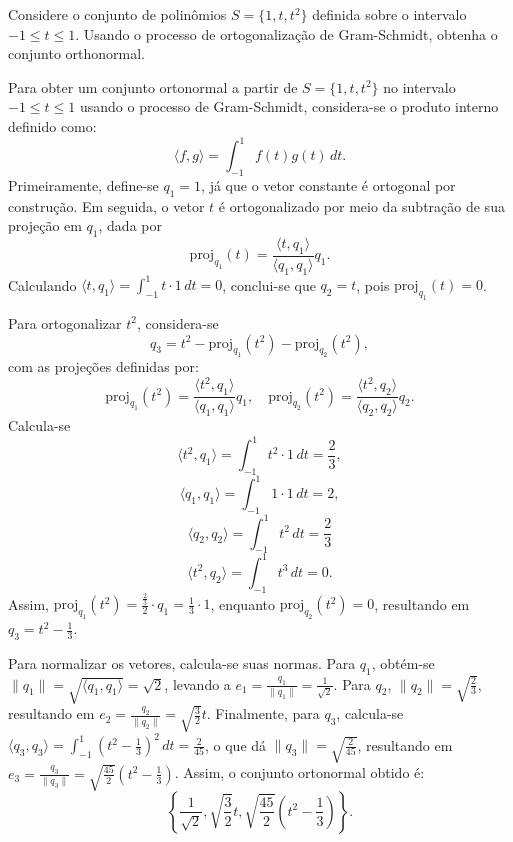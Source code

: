 \begin{question}
  Considere o conjunto de polinômios $S = \{1, t, t^2\}$ definida sobre o intervalo $-1 \leq t \leq 1$. Usando o processo de ortogonalização de Gram-Schmidt, obtenha o conjunto orthonormal.
\end{question}

\begin{resolution}
  Para obter um conjunto ortonormal a partir de \( S = \{1, t, t^2\} \) no intervalo \( -1 \leq t \leq 1 \) usando o processo de Gram-Schmidt, considera-se o produto interno definido como:
  $$ \langle f, g \rangle = \int_{-1}^1 f(t) g(t) \, dt.$$
  Primeiramente, define-se \( q_1 = 1 \), já que o vetor constante é ortogonal por construção. Em seguida, o vetor \( t \) é ortogonalizado por meio da subtração de sua projeção em \( q_1 \), dada por
  $$ \text{proj}_{q_1}(t) = \frac{\langle t, q_1 \rangle}{\langle q_1, q_1 \rangle} q_1.$$
  Calculando \( \langle t, q_1 \rangle = \int_{-1}^1 t \cdot 1 \, dt = 0 \), conclui-se que \( q_2 = t \), pois \( \text{proj}_{q_1}(t) = 0 \).

  Para ortogonalizar \( t^2 \), considera-se
  $$ q_3 = t^2 - \text{proj}_{q_1}(t^2) - \text{proj}_{q_2}(t^2),$$
  com as projeções definidas por:
  $$ \text{proj}_{q_1}(t^2) = \frac{\langle t^2, q_1 \rangle}{\langle q_1, q_1 \rangle} q_1, \quad \text{proj}_{q_2}(t^2) = \frac{\langle t^2, q_2 \rangle}{\langle q_2, q_2 \rangle} q_2.$$
  Calcula-se
  $$ \langle t^2, q_1 \rangle = \int_{-1}^1 t^2 \cdot 1 \, dt = \frac{2}{3},$$
  $$ \langle q_1, q_1 \rangle = \int_{-1}^1 1 \cdot 1 \, dt = 2,$$
  $$ \langle q_2, q_2 \rangle = \int_{-1}^1 t^2 \, dt = \frac{2}{3}$$
  $$ \langle t^2, q_2 \rangle = \int_{-1}^1 t^3 \, dt = 0 .$$
  Assim, \( \text{proj}_{q_1}(t^2) = \frac{\frac{2}{3}}{2} \cdot q_1 = \frac{1}{3} \cdot 1 \), enquanto \( \text{proj}_{q_2}(t^2) = 0 \), resultando em \( q_3 = t^2 - \frac{1}{3} \).

  Para normalizar os vetores, calcula-se suas normas. Para \( q_1 \), obtém-se \( \|q_1\| = \sqrt{\langle q_1, q_1 \rangle} = \sqrt{2} \), levando a \( e_1 = \frac{q_1}{\|q_1\|} = \frac{1}{\sqrt{2}} \). Para \( q_2 \), \( \|q_2\| = \sqrt{\frac{2}{3}} \), resultando em \( e_2 = \frac{q_2}{\|q_2\|} = \sqrt{\frac{3}{2}} t \). Finalmente, para \( q_3 \), calcula-se \( \langle q_3, q_3 \rangle = \int_{-1}^1 \left(t^2 - \frac{1}{3}\right)^2 \, dt = \frac{2}{45} \), o que dá \( \|q_3\| = \sqrt{\frac{2}{45}} \), resultando em \( e_3 = \frac{q_3}{\|q_3\|} = \sqrt{\frac{45}{2}} \left(t^2 - \frac{1}{3}\right) \). Assim, o conjunto ortonormal obtido é:
  $$\left\{\frac{1}{\sqrt{2}}, \sqrt{\frac{3}{2}} t, \sqrt{\frac{45}{2}} \left(t^2 - \frac{1}{3}\right)\right\}.$$
\end{resolution}

